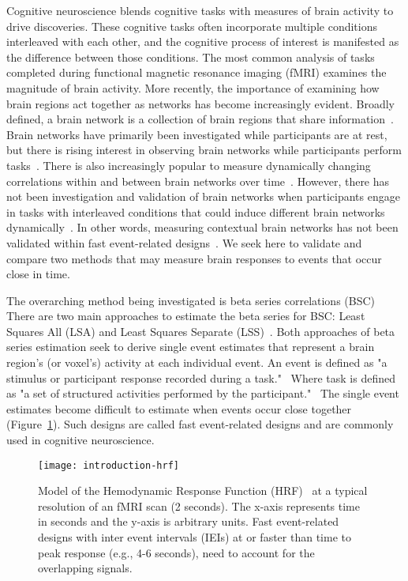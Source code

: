 \documentclass[phd,appendix,figures]{uithesis}
\begin{document}
Cognitive neuroscience blends cognitive tasks with measures of brain activity to drive discoveries.
These cognitive tasks often incorporate multiple conditions interleaved with each other,
and the cognitive process of interest is manifested as the difference between those conditions.
The most common analysis of tasks completed during functional magnetic resonance imaging (fMRI)
examines the magnitude of brain activity.
More recently, the importance of examining how brain regions act together as networks has become increasingly evident.
Broadly defined, a brain network is a collection of brain regions that share information~\cite{Uddin2019}.
Brain networks have primarily been investigated while participants are at rest, but there
is rising interest in observing brain networks while participants perform tasks~\cite{Cole2014a}.
There is also increasingly popular to measure dynamically changing correlations
within and between brain networks over time~\cite{Sakoglu2008,Hindriks2016}.
However, there has not been investigation and validation of brain networks
when participants engage in tasks with interleaved conditions that could induce
different brain networks dynamically~\cite{Di2019a}.
In other words, measuring contextual brain networks has not been validated within fast event-related designs~\cite{Buckner1998}.
We seek here to validate and compare two methods that may measure brain responses to events that occur
close in time.

The overarching method being investigated is beta series correlations (BSC)~\cite{Rissman2004,Mumford2012,Turner2012a,Abdulrahman2016}
There are two main approaches to estimate the beta series for BSC: Least Squares All (LSA) and Least Squares Separate (LSS)~\cite{Mumford2012}.
Both approaches of beta series estimation seek to derive single event estimates that represent a brain region's
(or voxel's) activity at each individual event.
An event is defined as "a stimulus or participant response recorded during a task."~\cite{Gorgolewski2016}
Where task is defined as "a set of structured activities performed by the participant."~\cite{Gorgolewski2016}
The single event estimates become difficult to estimate when events occur close together (Figure~\ref{fig:introhrf}).
Such designs are called fast event-related designs and are commonly
used in cognitive neuroscience.

\begin{figure}[H]
  \centering
  \texttt{[image: introduction-hrf]}
  \caption[Model of the Hemodynamic Response Function (HRF)]{
    Model of the Hemodynamic Response Function (HRF)~\cite{Glover1999} at a
    typical resolution of an fMRI scan (2 seconds). The x-axis represents time in seconds and the y-axis is arbitrary units.
    Fast event-related designs with inter event intervals (IEIs) at or faster than time to peak
    response (e.g., 4-6 seconds), need to account for the overlapping signals.
  }
  \label{fig:introhrf}
\end{figure}
\end{document}

